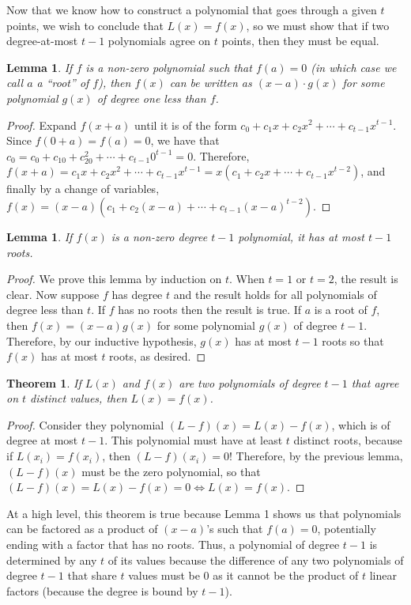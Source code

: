 \documentclass[12pt]{article}
\newtheorem{thm}[claim]{Theorem}
\newtheorem{lemma}[claim]{Lemma}
\theoremstyle{definition}
\theoremstyle{remark}
\theoremstyle{definition}
\begin{document}
Now that we know how to construct a polynomial that goes through a given $t$ points, we wish to conclude that $L(x) = f(x)$, so we must show that if two degree-at-most $t-1$ polynomials agree on $t$ points, then they must be equal.

\begin{lemma} If $f$ is a non-zero polynomial such that $f(a) = 0$ (in which case we call $a$ a ``root'' of $f$), then $f(x)$ can be written as $(x-a)\cdot g(x)$ for some polynomial $g(x)$ of degree one less than $f$.
\end{lemma}
\begin{proof}
Expand $f(x+a)$ until it is of the form $c_0 + c_1x + c_2x^2 + \cdots + c_{t-1}x^{t-1}$. Since $f(0+a) = f(a) = 0$, we have that $c_0 = c_0 + c_10 + c_20^2 + \cdots + c_{t-1}0^{t-1} = 0$. Therefore, $f(x+a) = c_1x + c_2x^2 + \cdots + c_{t-1}x^{t-1} = x(c_1 + c_2x + \cdots + c_{t-1}x^{t-2})$, and finally by a change of variables, $f(x) = (x-a)(c_1 + c_2(x-a) + \cdots + c_{t-1}(x-a)^{t-2})$.
\end{proof}

\begin{lemma}
If $f(x)$ is a non-zero degree $t-1$ polynomial, it has at most $t-1$ roots.
\end{lemma}
\begin{proof}
We prove this lemma by induction on $t$. When $t=1$ or $t=2$, the result is clear. Now suppose $f$ has degree $t$ and the result holds for all polynomials of degree less than $t$. If $f$ has no roots then the result is true. If $a$ is a root of $f$, then $f(x) = (x-a)g(x)$ for some polynomial $g(x)$ of degree $t-1$. Therefore, by our inductive hypothesis, $g(x)$ has at most $t-1$ roots so that $f(x)$ has at most $t$ roots, as desired.
\end{proof}

\begin{thm} If $L(x)$ and $f(x)$ are two polynomials of degree $t-1$ that agree on $t$ distinct values, then $L(x) = f(x)$.
\end{thm}
\begin{proof}
Consider they polynomial $(L-f)(x) = L(x) - f(x)$, which is of degree at most $t-1$. This polynomial must have at least $t$ distinct roots, because if $L(x_i) = f(x_i)$, then $(L-f)(x_i) = 0$! Therefore, by the previous lemma, $(L-f)(x)$ must be the zero polynomial, so that $(L-f)(x) = L(x) - f(x) = 0\Leftrightarrow L(x) = f(x)$.
\end{proof}

At a high level, this theorem is true because Lemma 1 shows us that polynomials can be factored as a product of $(x-a)$'s such that $f(a) = 0$, potentially ending with a factor that has no roots. Thus, a polynomial of degree $t-1$ is determined by any $t$ of its values because the difference of any two polynomials of degree $t-1$ that share $t$ values must be $0$ as it cannot be the product of $t$ linear factors (because the degree is bound by $t-1$).\\
\end{document}
